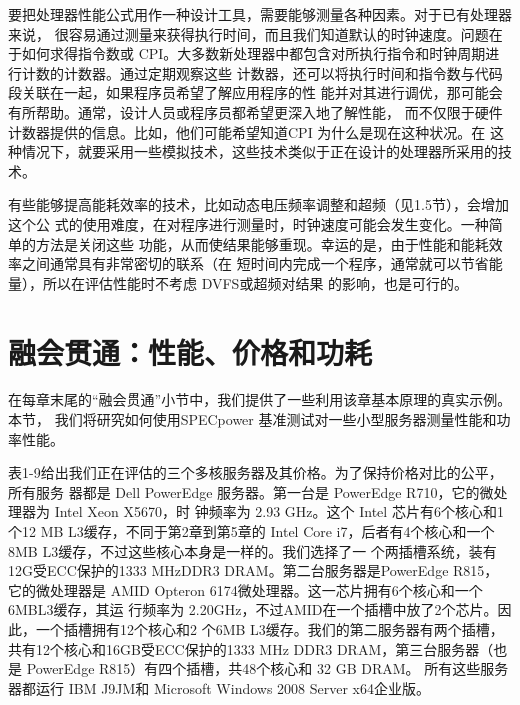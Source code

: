要把处理器性能公式用作一种设计工具，需要能够测量各种因素。对于已有处理器来说，
很容易通过测量来获得执行时间，而且我们知道默认的时钟速度。问题在于如何求得指令数或
CPI。大多数新处理器中都包含对所执行指令和时钟周期进行计数的计数器。通过定期观察这些
计数器，还可以将执行时间和指令数与代码段关联在一起，如果程序员希望了解应用程序的性
能并对其进行调优，那可能会有所帮助。通常，设计人员或程序员都希望更深入地了解性能，
而不仅限于硬件计数器提供的信息。比如，他们可能希望知道CPI 为什么是现在这种状况。在
这种情况下，就要采用一些模拟技术，这些技术类似于正在设计的处理器所采用的技术。

有些能够提高能耗效率的技术，比如动态电压频率调整和超频（见1.5节），会增加这个公
式的使用难度，在对程序进行测量时，时钟速度可能会发生变化。一种简单的方法是关闭这些
功能，从而使结果能够重现。幸运的是，由于性能和能耗效率之间通常具有非常密切的联系（在
短时间内完成一个程序，通常就可以节省能量），所以在评估性能时不考虑 DVFS或超频对结果
的影响，也是可行的。

\section{融会贯通：性能、价格和功耗}
在每章末尾的“融会贯通”小节中，我们提供了一些利用该章基本原理的真实示例。本节，
我们将研究如何使用SPECpower 基准测试对一些小型服务器测量性能和功率性能。

表1-9给出我们正在评估的三个多核服务器及其价格。为了保持价格对比的公平，所有服务
器都是 Dell PowerEdge 服务器。第一台是 PowerEdge R710，它的微处理器为 Intel Xeon X5670，时
钟频率为 2.93 GHz。这个 Intel 芯片有6个核心和1个12 MB L3缓存，不同于第2章到第5章的
Intel Core i7，后者有4个核心和一个8MB L3缓存，不过这些核心本身是一样的。我们选择了一
个两插槽系统，装有12G受ECC保护的1333 MHzDDR3 DRAM。第二台服务器是PowerEdge R815，
它的微处理器是 AMID Opteron 6174微处理器。这一芯片拥有6个核心和一个 6MBL3缓存，其运
行频率为 2.20GHz，不过AMID在一个插槽中放了2个芯片。因此，一个插槽拥有12个核心和2
个6MB L3缓存。我们的第二服务器有两个插槽，共有12个核心和16GB受ECC保护的1333 MHz
DDR3 DRAM，第三台服务器（也是 PowerEdge R815）有四个插槽，共48个核心和 32 GB DRAM。
所有这些服务器都运行 IBM J9JM和 Microsoft Windows 2008 Server x64企业版。

